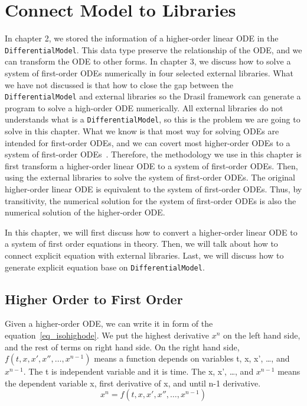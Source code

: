 \chapter{Connect Model to Libraries}
In chapter 2, we stored the information of a higher-order linear ODE in the \verb|DifferentialModel|. This data type preserve the relationship of the ODE, and we can transform the ODE to other forms. In chapter 3, we discuss how to solve a system of first-order ODEs numerically in four selected external libraries. What we have not discussed is that how to close the gap between the \verb|DifferentialModel| and external libraries so the Drasil framework can generate a program to solve a high-order ODE numerically. All external libraries do not understands what is a \verb|DifferentialModel|, so this is the problem we are going to solve in this chapter. What we know is that most way for solving ODEs are intended for first-order ODEs, and we can covert most higher-order ODEs to a system of first-order ODEs~\citep{converthigherode}. Therefore, the methodology we use in this chapter is first transform a higher-order linear ODE to a system of first-order ODEs. Then, using the external libraries to solve the system of first-order ODEs. The original higher-order linear ODE is equivalent to the system of first-order ODEs. Thus, by transitivity, the numerical solution for the system of first-order ODEs is also the numerical solution of the higher-order ODE.

In this chapter, we will first discuss how to convert a higher-order linear ODE to a system of first order equations in theory. Then, we will talk about how to connect explicit equation with external libraries. Last, we will discuss how to generate explicit equation base on \verb|DifferentialModel|.

\section{Higher Order to First Order}
Given a higher-order ODE, we can write it in form of the equation~\ref{eq_isohighode}. We put the highest derivative $x^n$ on the left hand side, and the rest of terms on right hand side. On the right hand side, $f (t, x, x', x'', \dots, x^{n-1})$ means a function depends on variables t, x, x', \dots, and $x^{n-1}$. The t is independent variable and it is time. The x, x', \dots, and $x^{n-1}$ means the dependent variable x, first derivative of x, and until n-1 derivative.
\begin{equation} \label{eq_isohighode}
  x^n = f (t, x, x', x'', \dots, x^{n-1})
\end{equation}

